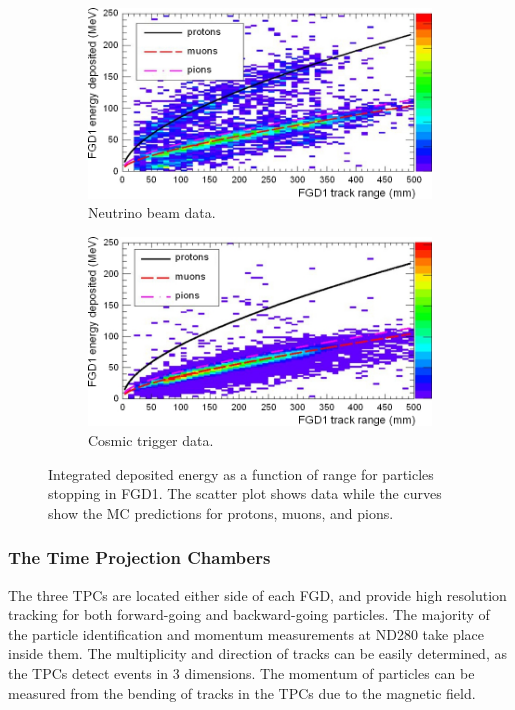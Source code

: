 \begin{figure}
\centering
\begin{subfigure}{.5\textwidth}
  \centering
  \includegraphics[width=0.95\linewidth]{figs/FGD1beam}
  \caption{Neutrino beam data.}
  \label{fig:fgd1beam}
\end{subfigure}%
\begin{subfigure}{.5\textwidth}
  \centering
  \includegraphics[width=0.95\linewidth]{figs/FGD1cosmic}
  \caption{Cosmic trigger data.}
  \label{fig:FGD1cosmic}
\end{subfigure}
\caption{Integrated deposited energy as a function of range for particles stopping in FGD1. The scatter plot shows data while the curves show the MC predictions for protons, muons, and pions.}
\label{fig:FGD1}
\end{figure}

\subsubsection{The Time Projection Chambers}\label{sec:tpc}

The three TPCs are located either side of each FGD, and provide high resolution tracking for both forward-going and backward-going particles. The majority of the particle identification and momentum measurements at ND280 take place inside them. The multiplicity and direction of tracks can be easily determined, as the TPCs detect events in 3 dimensions. The momentum of particles can be measured from the bending of tracks in the TPCs due to the magnetic field.

